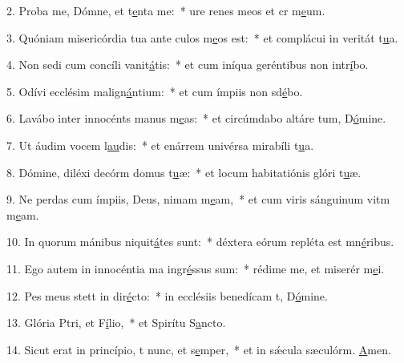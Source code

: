 2. Proba me, Dómne, et t\uline{e}nta me:~* ure renes meos et cr m\uline{e}um.\par 
3. Quóniam misericórdia tua ante culos m\uline{e}os est:~* et complácui in veritát t\uline{u}a.\par 
4. Non sedi cum concíli vanit\uline{á}tis:~* et cum iníqua geréntibus non intr\uline{í}bo.\par 
5. Odívi ecclésim malign\uline{á}ntium:~* et cum ímpiis non sd\uline{é}bo.\par 
6. Lavábo inter innocénts manus m\uline{e}as:~* et circúmdabo altáre tum, D\uline{ó}mine.\par 
7. Ut áudim vocem l\uline{au}dis:~* et enárrem univérsa mirabíli t\uline{u}a.\par 
8. Dómine, diléxi decórm domus t\uline{u}æ:~* et locum habitatiónis glóri t\uline{u}æ.\par 
9. Ne perdas cum ímpiis, Deus, nimam m\uline{e}am,~* et cum viris sánguinum vitm m\uline{e}am.\par 
10. In quorum mánibus niquit\uline{á}tes sunt:~* déxtera eórum repléta est mn\uline{é}ribus.\par 
11. Ego autem in innocéntia ma ingr\uline{é}ssus sum:~* rédime me, et miserér m\uline{e}i.\par 
12. Pes meus stett in dir\uline{é}cto:~* in ecclésiis benedícam t, D\uline{ó}mine.\par 
13. Glória Ptri, et F\uline{í}lio,~* et Spirítu S\uline{a}ncto.\par 
14. Sicut erat in princípio, t nunc, et s\uline{e}mper,~* et in sǽcula sæculórm. \uline{A}men.\par 
